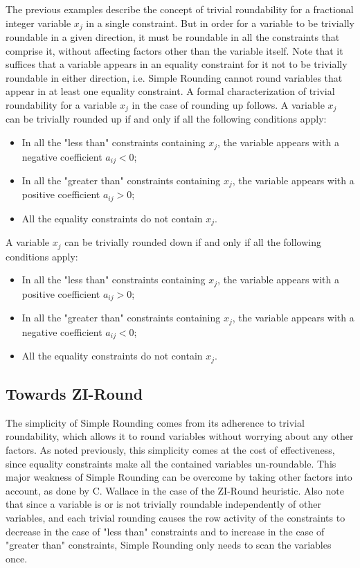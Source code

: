 \documentclass[a4paper,12pt]{book}
\begin{document}
The previous examples describe the concept of trivial roundability for a fractional integer variable $x_j$ in a single constraint. But in order for a variable to be trivially roundable in a given direction, it must be roundable in all the constraints that comprise it, without affecting factors other than the variable itself. 
Note that it suffices that a variable appears in an equality constraint for it not to be trivially roundable in either direction, i.e. Simple Rounding cannot round variables that appear in at least one equality constraint.
A formal characterization of trivial roundability for a variable $x_j$ in the case of rounding up follows.
A variable $x_j$ can be trivially rounded up if and only if all the following conditions apply:
\begin{itemize}
	\item In all the "less than" constraints containing $x_j$, the variable appears with a negative coefficient $a_{ij} < 0$;
	\item In all the "greater than" constraints containing $x_j$, the variable appears with a positive coefficient $a_{ij} > 0$;
	\item All the equality constraints do not contain $x_j$.
\end{itemize}
A variable $x_j$ can be trivially rounded down if and only if all the following conditions apply:
\begin{itemize}
	\item In all the "less than" constraints containing $x_j$, the variable appears with a positive coefficient $a_{ij} > 0$;
	\item In all the "greater than" constraints containing $x_j$, the variable appears with a negative coefficient $a_{ij} < 0$;
	\item All the equality constraints do not contain $x_j$.
\end{itemize}
\par

\subsection{Towards ZI-Round}
The simplicity of Simple Rounding comes from its adherence to trivial roundability, which allows it to round variables without worrying about any other factors. As noted previously, this simplicity comes at the cost of effectiveness, since equality constraints make all the contained variables un-roundable. This major weakness of Simple Rounding can be overcome by taking other factors into account, as done by C. Wallace \cite{wallace2010} in the case of the ZI-Round heuristic. Also note that since a variable is or is not trivially roundable independently of other variables, and each trivial rounding causes the row activity of the constraints to decrease in the case of "less than" constraints and to increase in the case of "greater than" constraints, Simple Rounding only needs to scan the variables once.
\end{document}

